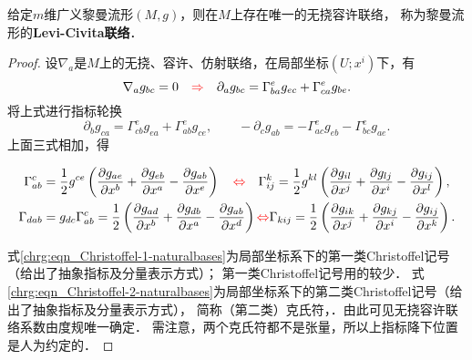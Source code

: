 \begin{theorem}\label{chrg:thm_Levi-Civita-Connetion}
    给定$m$维广义黎曼流形$(M,g)$，则在$M$上存在唯一的无挠容许联络，
    称为黎曼流形的{\bfseries \heiti Levi-Civita联络}．
\end{theorem}
\begin{proof}
    设$\nabla_a$是$M$上的无挠、容许、仿射联络，在局部坐标$(U;x^i)$下，有
    \begin{equation} \label{chrg:eqn_Dg=0}
        \nabla_a g_{bc} =0  {\quad \color{red}\Rightarrow \quad }
        \partial_a g_{bc} = \Gamma_{ba}^e g_{ec} + \Gamma_{ca}^e g_{be} .
    \end{equation}
    将上式进行指标轮换
    \begin{equation*}
        \partial_b g_{ca} = \Gamma_{cb}^e g_{ea} + \Gamma_{ab}^e g_{ce}, \qquad
        -\partial_c g_{ab} = -\Gamma_{ac}^e g_{eb} - \Gamma_{bc}^e g_{ae}  .
    \end{equation*}
    上面三式相加，得
    \begin{small}     \setlength{\mathindent}{0em}
    \begin{subequations}\label{chrg:eqn_Christoffel-naturalbases}
        \begin{align}
            \Gamma_{ab}^c &= \frac{1}{2}g^{ce}\left(
                  \frac{\partial g_{ae}}{\partial x^b}
                + \frac{\partial g_{eb}}{\partial x^a}
                - \frac{\partial g_{ab}}{\partial x^e} \right)
                {\quad \color{red}\Leftrightarrow \quad}
            \Gamma_{ij}^k = \frac{1}{2}{g^{kl}}\left(
                  \frac{\partial g_{il}}{\partial x^j}
                + \frac{\partial g_{lj}}{\partial x^i}
                - \frac{\partial g_{ij}}{\partial x^l} \right),
            \label{chrg:eqn_Christoffel-2-naturalbases} \\
            \Gamma _{dab} &= {g_{dc}}\Gamma _{ab}^c = \frac{1}{2}\left(
                  \frac{\partial g_{ad}}{\partial x^b}
                + \frac{\partial g_{db}}{\partial x^a}
                - \frac{\partial g_{ab}}{\partial x^d} \right)
               {\color{red}\Leftrightarrow}
            \Gamma _{kij} = \frac{1}{2}\left(
                  \frac{\partial g_{ik}}{\partial x^j}
                + \frac{\partial g_{kj}}{\partial x^i}
                - \frac{\partial g_{ij}}{\partial x^k} \right) .
            \label{chrg:eqn_Christoffel-1-naturalbases}
        \end{align}
    \end{subequations}    \setlength{\mathindent}{2em}
    \end{small}
    式\eqref{chrg:eqn_Christoffel-1-naturalbases}为局部坐标系下的第一类Christoffel记号（给出了抽象指标及分量表示方式）；
    第一类Christoffel记号用的较少．
    式\eqref{chrg:eqn_Christoffel-2-naturalbases}为局部坐标系下的第二类Christoffel记号（给出了抽象指标及分量表示方式），
    简称（第二类）克氏符，．由此可见无挠容许联络系数由度规唯一确定．
    需注意，两个克氏符都不是张量，所以上指标降下位置是人为约定的．


\end{proof}
